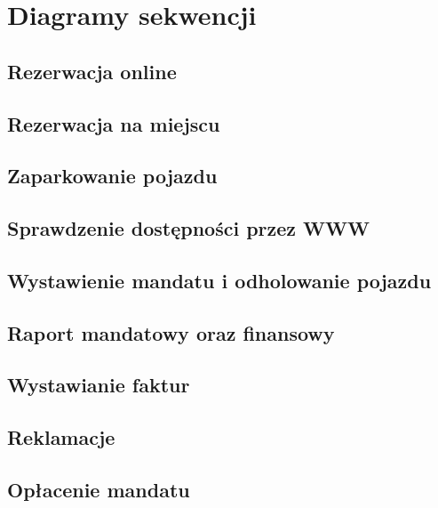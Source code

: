 \newpage
\section{Diagramy sekwencji}
\subsection{Rezerwacja online}
\subsection{Rezerwacja na miejscu}
\subsection{Zaparkowanie pojazdu}
\subsection{Sprawdzenie dostępności przez WWW}
\subsection{Wystawienie mandatu i odholowanie pojazdu}
\subsection{Raport mandatowy oraz finansowy}
\subsection{Wystawianie faktur}
\subsection{Reklamacje}
\subsection{Opłacenie mandatu}
\begin{center}
\newpage

\newpage

\newpage

\newpage

\newpage

\newpage

\newpage

\newpage

\newpage

\end{center}